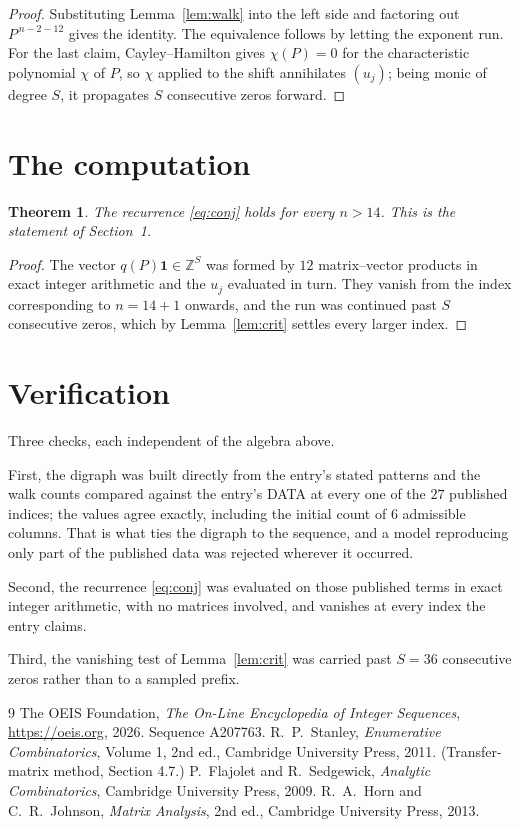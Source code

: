 \documentclass[11pt,a4paper]{article}
\theoremstyle{plain}
\newtheorem{theorem}{Theorem}
\theoremstyle{definition}
\begin{document}
\begin{proof}
Substituting Lemma~\ref{lem:walk} into the left side and factoring out
$P^{\,n-2-12}$ gives the identity. The equivalence follows by letting the exponent
run. For the last claim, Cayley--Hamilton gives $\chi(P)=0$ for the characteristic
polynomial $\chi$ of $P$, so $\chi$ applied to the shift annihilates $(u_j)$; being monic of
degree $S$, it propagates $S$ consecutive zeros forward.
\end{proof}

\section{The computation}

\begin{theorem}
The recurrence \eqref{eq:conj} holds for every $n>14$. This is the statement of
Section~1.
\end{theorem}

\begin{proof}
The vector $q(P)\mathbf{1}\in\mathbb{Z}^{S}$ was formed by $12$ matrix--vector
products in exact integer arithmetic and the $u_j$ evaluated in turn. They vanish from the
index corresponding to $n=14+1$ onwards, and the run was continued past $S$ consecutive
zeros, which by Lemma~\ref{lem:crit} settles every larger index.
\end{proof}

\section{Verification}

Three checks, each independent of the algebra above.

First, the digraph was built directly from the entry's stated patterns and the walk counts
compared against the entry's DATA at every one of the $27$ published indices; the
values agree exactly, including the initial count of $6$ admissible columns. That is
what ties the digraph to the sequence, and a model reproducing only part of the published
data was rejected wherever it occurred.

Second, the recurrence \eqref{eq:conj} was evaluated on those published terms in exact
integer arithmetic, with no matrices involved, and vanishes at every index the entry claims.

Third, the vanishing test of Lemma~\ref{lem:crit} was carried past $S=36$ consecutive
zeros rather than to a sampled prefix.

\begin{thebibliography}{9}
 The OEIS Foundation, \emph{The On-Line Encyclopedia of Integer
Sequences}, \url{https://oeis.org}, 2026. Sequence A207763.
 R.~P.~Stanley, \emph{Enumerative Combinatorics}, Volume 1, 2nd ed.,
Cambridge University Press, 2011. (Transfer-matrix method, Section 4.7.)
 P.~Flajolet and R.~Sedgewick, \emph{Analytic Combinatorics}, Cambridge
University Press, 2009.
 R.~A.~Horn and C.~R.~Johnson, \emph{Matrix Analysis}, 2nd ed., Cambridge
University Press, 2013.
\end{thebibliography}
\end{document}
